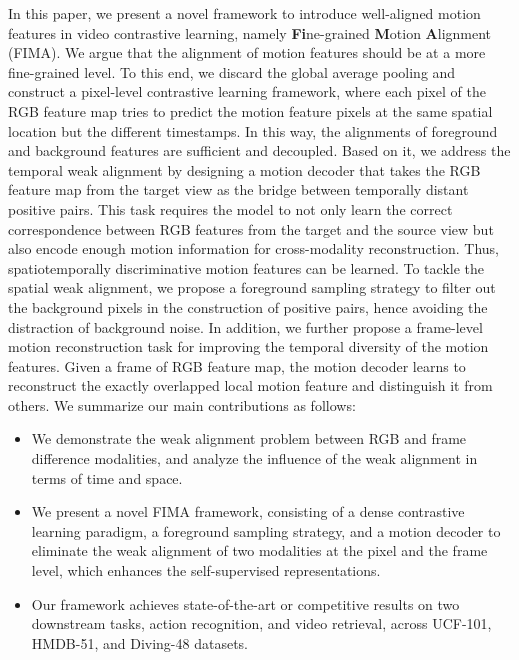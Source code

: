 \documentclass[sigconf,screen]{acmart}
\begin{document}
In this paper, we present a novel framework to introduce well-aligned motion features in video contrastive learning, namely \textbf{Fi}ne-grained \textbf{M}otion \textbf{A}lignment (FIMA). 
We argue that the alignment of motion features should be at a more fine-grained level. To this end, we discard the global average pooling and construct a pixel-level contrastive learning framework, where each pixel of the RGB feature map tries to predict the motion feature pixels at the same spatial location but the different timestamps. In this way, the alignments of foreground and background features are sufficient and decoupled. Based on it, we address the temporal weak alignment by designing a motion decoder that takes the RGB feature map from the target view as the bridge between temporally distant positive pairs. This task requires the model to not only learn the correct correspondence between RGB features from the target and the source view but also encode enough motion information for cross-modality reconstruction. Thus, spatiotemporally discriminative motion features can be learned. To tackle the spatial weak alignment, we propose a foreground sampling strategy to filter out the background pixels in the construction of positive pairs, hence avoiding the distraction of background noise. In addition, we further propose a frame-level motion reconstruction task for improving the temporal diversity of the motion features. Given a frame of RGB feature map, the motion decoder learns to reconstruct the exactly overlapped local motion feature and distinguish it from others.
We summarize our main contributions as follows:
\begin{itemize}[noitemsep,topsep=0pt,leftmargin=*]
\item We demonstrate the weak alignment problem between RGB and frame difference modalities, and analyze the influence of the weak alignment in terms of time and space.
\item We present a novel FIMA framework, consisting of a dense contrastive learning paradigm, a foreground sampling strategy, and a motion decoder to eliminate the weak alignment of two modalities at the pixel and the frame level, which enhances the self-supervised representations.
\item Our framework achieves state-of-the-art or competitive results on two downstream tasks, action recognition, and video retrieval, across UCF-101, HMDB-51, and Diving-48 datasets.
\end{itemize}
\end{document}
